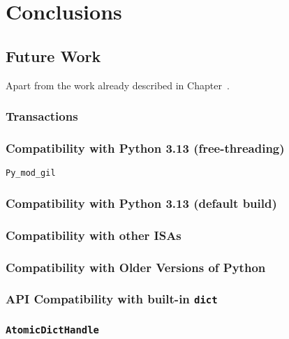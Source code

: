 \chapter{Conclusions}\label{ch:conclusions}

\section{Future Work}\label{sec:future-work}

Apart from the work already described in Chapter~\cite{ch:design-and-implementation}.

\subsection{Transactions}\label{subsec:transactions}

\subsection{Compatibility with Python 3.13 (free-threading)}\label{subsec:compatibility-with-3.13-free-threading}

\texttt{Py\_mod\_gil}

\subsection{Compatibility with Python 3.13 (default build)}\label{subsec:compatibility-with-3.13-default-build}

\subsection{Compatibility with other ISAs}\label{subsec:compatibility-with-other-isas}

\subsection{Compatibility with Older Versions of Python}\label{subsec:compatibility-with-older-versions-of-python}

\subsection{API Compatibility with built-in \texttt{dict}}\label{subsec:api-compatibility-with-dict}

\subsection{\texttt{AtomicDictHandle}}\label{subsec:atomicdicthandle}

